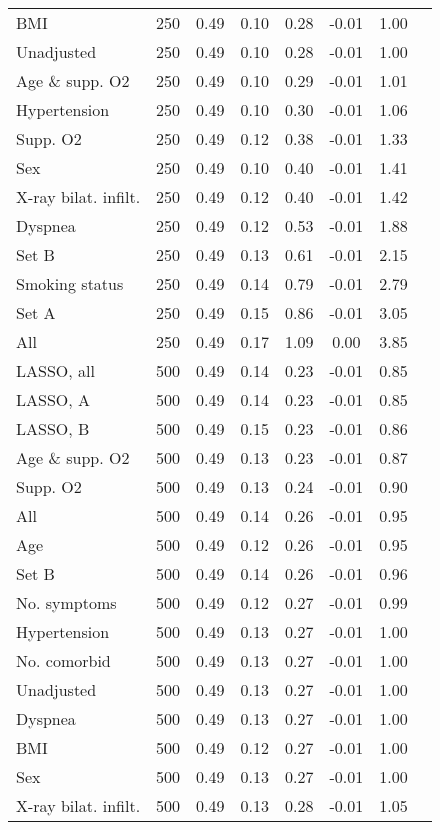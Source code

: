 \documentclass{article}
\begin{document}
{\begin{longtable}{lccccccc}
BMI & 250 & 0.49 & 0.10 & 0.28 & -0.01 & 1.00\\
Unadjusted & 250 & 0.49 & 0.10 & 0.28 & -0.01 & 1.00\\
Age \& supp. O2 & 250 & 0.49 & 0.10 & 0.29 & -0.01 & 1.01\\
Hypertension & 250 & 0.49 & 0.10 & 0.30 & -0.01 & 1.06\\
Supp. O2 & 250 & 0.49 & 0.12 & 0.38 & -0.01 & 1.33\\
Sex & 250 & 0.49 & 0.10 & 0.40 & -0.01 & 1.41\\
X-ray bilat. infilt. & 250 & 0.49 & 0.12 & 0.40 & -0.01 & 1.42\\
Dyspnea & 250 & 0.49 & 0.12 & 0.53 & -0.01 & 1.88\\
Set B & 250 & 0.49 & 0.13 & 0.61 & -0.01 & 2.15\\
Smoking status & 250 & 0.49 & 0.14 & 0.79 & -0.01 & 2.79\\
Set A & 250 & 0.49 & 0.15 & 0.86 & -0.01 & 3.05\\
All & 250 & 0.49 & 0.17 & 1.09 & 0.00 & 3.85\\ \midrule
LASSO, all & 500 & 0.49 & 0.14 & 0.23 & -0.01 & 0.85\\
LASSO, A & 500 & 0.49 & 0.14 & 0.23 & -0.01 & 0.85\\
LASSO, B & 500 & 0.49 & 0.15 & 0.23 & -0.01 & 0.86\\
Age \& supp. O2 & 500 & 0.49 & 0.13 & 0.23 & -0.01 & 0.87\\
Supp. O2 & 500 & 0.49 & 0.13 & 0.24 & -0.01 & 0.90\\
All & 500 & 0.49 & 0.14 & 0.26 & -0.01 & 0.95\\
Age & 500 & 0.49 & 0.12 & 0.26 & -0.01 & 0.95\\
Set B & 500 & 0.49 & 0.14 & 0.26 & -0.01 & 0.96\\
No. symptoms & 500 & 0.49 & 0.12 & 0.27 & -0.01 & 0.99\\
Hypertension & 500 & 0.49 & 0.13 & 0.27 & -0.01 & 1.00\\
No. comorbid & 500 & 0.49 & 0.13 & 0.27 & -0.01 & 1.00\\
Unadjusted & 500 & 0.49 & 0.13 & 0.27 & -0.01 & 1.00\\
Dyspnea & 500 & 0.49 & 0.13 & 0.27 & -0.01 & 1.00\\
BMI & 500 & 0.49 & 0.12 & 0.27 & -0.01 & 1.00\\
Sex & 500 & 0.49 & 0.13 & 0.27 & -0.01 & 1.00\\
X-ray bilat. infilt. & 500 & 0.49 & 0.13 & 0.28 & -0.01 & 1.05\\

\end{longtable}}
\end{document}
